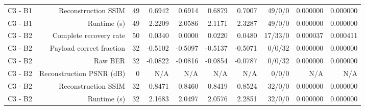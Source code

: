 \begin{table}[htbp]
\begin{tabular}{lrrrrrrrrr}
C3 - B1 & Reconstruction SSIM & 49 & 0.6942 & 0.6914 & 0.6879 & 0.7007 & 49/0/0 & 0.000000 & 0.000000 \\
C3 - B1 & Runtime (s) & 49 & 2.2209 & 2.0586 & 2.1171 & 2.3287 & 49/0/0 & 0.000000 & 0.000000 \\
C3 - B2 & Complete recovery rate & 50 & 0.0340 & 0.0000 & 0.0220 & 0.0480 & 17/33/0 & 0.000037 & 0.000411 \\
C3 - B2 & Payload correct fraction & 32 & -0.5102 & -0.5097 & -0.5137 & -0.5071 & 0/0/32 & 0.000000 & 0.000000 \\
C3 - B2 & Raw BER & 32 & -0.0822 & -0.0816 & -0.0854 & -0.0787 & 0/0/32 & 0.000000 & 0.000000 \\
C3 - B2 & Reconstruction PSNR (dB) & 0 & N/A & N/A & N/A & N/A & 0/0/0 & N/A & N/A \\
C3 - B2 & Reconstruction SSIM & 32 & 0.8471 & 0.8460 & 0.8419 & 0.8524 & 32/0/0 & 0.000000 & 0.000000 \\
C3 - B2 & Runtime (s) & 32 & 2.1683 & 2.0497 & 2.0576 & 2.2851 & 32/0/0 & 0.000000 & 0.000000 \\
\bottomrule
\end{tabular}
\end{table}
